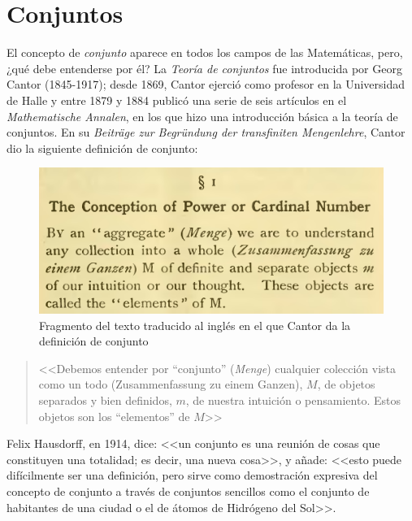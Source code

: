 \label{cap:Conjuntos}
\chapter{Conjuntos}

\minitoc

El concepto de \textit{conjunto} aparece en todos los campos de las
Matemáticas, pero, ¿qué debe entenderse por él? La \textit{Teoría de conjuntos}
fue introducida por Georg Cantor (1845-1917); desde 1869, Cantor ejerció como
profesor en la Universidad de Halle y entre 1879 y 1884 publicó una serie de
seis artículos en el \textit{Mathematische Annalen}, en los que hizo una
introducción básica a la teoría de conjuntos. En su \textit{Beiträge zur
Begründung der transfiniten Mengenlehre}, Cantor dio la siguiente definición
de conjunto:

\begin{figure}[h]
  \centering
  \includegraphics[scale=.2]{fig/definicionConjunto}
  \captionsetup{font=footnotesize}
  \caption{Fragmento del texto traducido al inglés en el que Cantor da la
    definición de conjunto}
\end{figure}

\begin{quote}
  <<Debemos entender por ``conjunto'' (\textit{Menge}) cualquier colección
  vista como un todo (Zusammenfassung zu einem Ganzen), $M$, de objetos
  separados y bien definidos, $m$, de nuestra intuición o pensamiento. Estos
  objetos son los ``elementos'' de $M$>>
\end{quote}

Felix Hausdorff, en 1914, dice: <<un conjunto es una reunión de cosas que
constituyen una totalidad; es decir, una nueva cosa>>, y añade: <<esto puede
difícilmente ser una definición, pero sirve como demostración expresiva del
concepto de conjunto a través de conjuntos sencillos como el conjunto de
habitantes de una ciudad o el de átomos de Hidrógeno del Sol>>.

